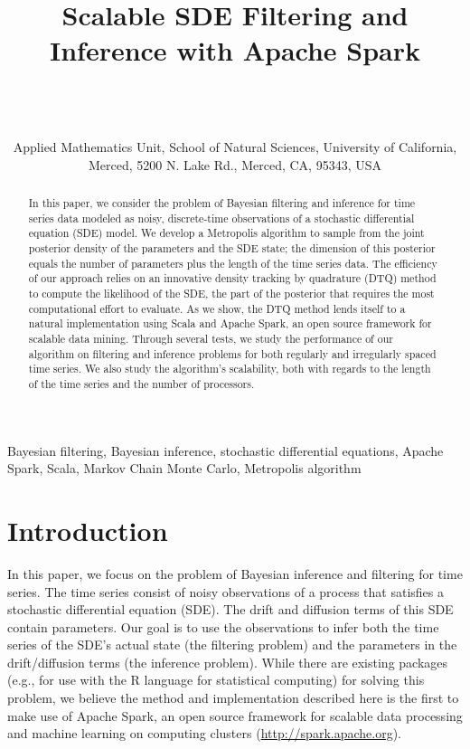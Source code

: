\documentclass[wcp]{jmlr}
\title[Scalable SDE Filtering and Inference]{Scalable SDE Filtering and Inference with Apache Spark}
\author{\Name{Harish S. Bhat} \Email{hbhat@ucmerced.edu}\\
\Name{R. W. M. A. Madushani} \Email{rmadushani@ucmerced.edu} \\
\Name{Shagun Rawat} \Email{srawat2@ucmerced.edu} \\
\addr Applied Mathematics Unit, School of Natural Sciences, University
of California, Merced, 5200 N. Lake Rd., Merced, CA, 95343, USA}
\begin{document}
\maketitle

\begin{abstract}
In this paper, we consider the problem of Bayesian filtering and
inference for time series data modeled as noisy, discrete-time
observations of a stochastic differential equation (SDE) model.  We
develop a Metropolis algorithm to sample from the joint posterior
density of the parameters and the SDE state; the dimension of this
posterior equals the number of parameters plus the length of the time
series data.  The efficiency of our approach relies on an innovative
density tracking by quadrature (DTQ) method to compute the likelihood
of the SDE, the part of the posterior that requires the most
computational effort to evaluate.  As we show, the DTQ method lends
itself to a natural implementation using Scala and Apache Spark, an
open source framework for scalable data mining.  Through several tests, we
study the performance of our algorithm on filtering and inference
problems for both regularly and irregularly spaced time series.  We
also study the algorithm's scalability, both with regards to the
length of the time series and the number of processors.
\end{abstract}

\begin{keywords}
Bayesian filtering, Bayesian inference, stochastic differential
equations, Apache Spark, Scala, Markov Chain Monte Carlo, Metropolis
algorithm
\end{keywords}

\section{Introduction}
\label{sect:intro}
In this paper, we focus on the problem of Bayesian
inference and filtering for time series.  The time series consist 
of noisy observations of a process that satisfies a stochastic
differential equation (SDE).  The drift and diffusion terms of this
SDE contain parameters.  Our goal is to use the observations to infer
both the time series of the SDE's actual state (the filtering
problem) and the parameters in the drift/diffusion terms (the
inference problem).  While there are existing packages (e.g., for use
with the R language for statistical computing) for solving this
problem, we believe the method and implementation described here is
the first to make use of Apache Spark, an open source framework for
scalable data processing and machine learning on computing clusters
(\url{http://spark.apache.org}).
\end{document}

